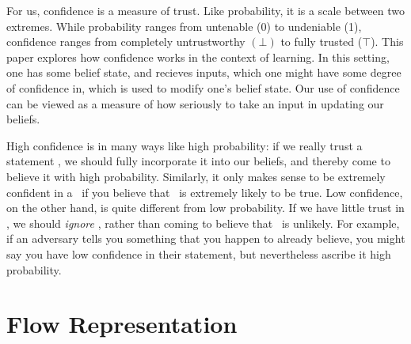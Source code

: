 \documentclass{uai2022} %
\begin{document}




For us, confidence is a measure of trust. 
Like probability, it is a scale between two extremes. 
While probability ranges from untenable (0) to undeniable (1),
confidence ranges from completely untrustworthy $(\bot)$ to fully trusted ($\top$). 
%
This paper explores how confidence works in the context of learning.
In this setting, one has some belief state, and recieves inputs, which one might have some degree of confidence in, which is used to modify one's belief state. 
Our use of confidence can be viewed as a measure of how seriously to take an input in updating our beliefs.

High confidence is in many ways like high probability: if we really trust a statement \stmt, we should fully incorporate it into our beliefs, and thereby come to believe it with high probability. 
Similarly, it only makes sense to be extremely confident in a \stmt\ if you believe that \stmt\ is extremely likely to be true. 
Low confidence, on the other hand, is quite different from low probability. 
If we have little trust in \stmt, we should \emph{ignore} \stmt, rather than coming to believe that \stmt\ is unlikely.
For example, if an adversary tells you something that you happen to already believe,
you might say you have low confidence in their statement, but nevertheless ascribe it high probability. 


\section{Flow Representation}
\end{document}
